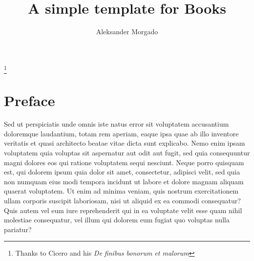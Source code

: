\documentclass{book}
\begin{document}
\pagestyle{empty}
\title{\textbf{A simple template for Books}}
\author{Aleksander Morgado}



\maketitle


\thispagestyle{empty}
\thanks{Thanks to Cicero and his \em{De finibus bonorum et malorum}}
\newpage




\pagestyle{fancy}
\fancyhf{}
\lhead[]{\thepage}
\rhead[\thepage]{}


\doublespacing



\chapter*{Preface}

Sed ut perspiciatis unde omnis iste natus error sit voluptatem accusantium
doloremque laudantium, totam rem aperiam, eaque ipsa quae ab illo inventore
veritatis et quasi architecto beatae vitae dicta sunt explicabo. Nemo enim
ipsam voluptatem quia voluptas sit aspernatur aut odit aut fugit, sed quia
consequuntur magni dolores eos qui ratione voluptatem sequi nesciunt. Neque
porro quisquam est, qui dolorem ipsum quia dolor sit amet, consectetur,
adipisci velit, sed quia non numquam eius modi tempora incidunt ut labore et
dolore magnam aliquam quaerat voluptatem. Ut enim ad minima veniam, quis nostrum
exercitationem ullam corporis suscipit laboriosam, nisi ut aliquid ex ea
commodi consequatur? Quis autem vel eum iure reprehenderit qui in ea voluptate
velit esse quam nihil molestiae consequatur, vel illum qui dolorem eum fugiat
quo voluptas nulla pariatur?
\end{document}
